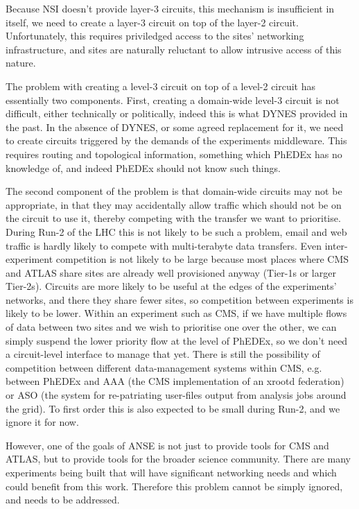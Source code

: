 Because NSI doesn't provide layer-3 circuits, this mechanism is insufficient in itself, we need to create a layer-3 circuit on top of the layer-2 circuit. Unfortunately, this requires priviledged access to the sites' networking infrastructure, and sites are naturally reluctant to allow intrusive access of this nature.

The problem with creating a level-3 circuit on top of a level-2 circuit has essentially two components. First, creating a domain-wide level-3 circuit is not difficult, either technically or politically, indeed this is what DYNES provided in the past. In the absence of DYNES, or some agreed replacement for it, we need to create circuits triggered by the demands of the experiments middleware. This requires routing and topological information, something which PhEDEx has no knowledge of, and indeed PhEDEx should not know such things.

The second component of the problem is that domain-wide circuits may not be appropriate, in that they may accidentally allow traffic which should not be on the circuit to use it, thereby competing with the transfer we want to prioritise. During Run-2 of the LHC this is not likely to be such a problem, email and web traffic is hardly likely to compete with multi-terabyte data transfers. Even inter-experiment competition is not likely to be large because most places where CMS and ATLAS share sites are already well provisioned anyway (Tier-1s or larger Tier-2s). Circuits are more likely to be useful at the edges of the experiments' networks, and there they share fewer sites, so competition between experiments is likely to be lower. Within an experiment such as CMS, if we have multiple flows of data between two sites and we wish to prioritise one over the other, we can simply suspend the lower priority flow at the level of PhEDEx, so we don't need a circuit-level interface to manage that yet. There is still the possibility of competition between different data-management systems within CMS, e.g. between PhEDEx and AAA\cite{AAA} (the CMS implementation of an xrootd\cite{xrootd} federation) or ASO\cite{ASO} (the system for re-patriating user-files output from analysis jobs around the grid). To first order this is also expected to be small during Run-2, and we ignore it for now.

However, one of the goals of ANSE is not just to provide tools for CMS and ATLAS, but to provide tools for the broader science community. There are many experiments being built that will have significant networking needs and which could benefit from this work. Therefore this problem cannot be simply ignored, and needs to be addressed.